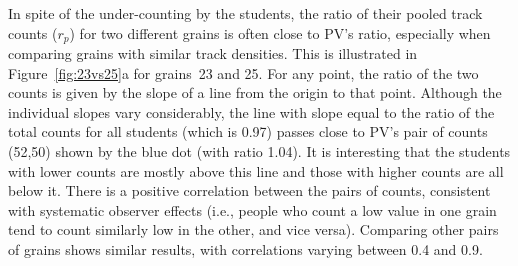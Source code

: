 \documentclass[gchron, manuscript]{copernicus}
\begin{document}
In spite of the under-counting by the students, the ratio of their
pooled track counts ($r_p$) for two different grains is often close to
PV's ratio, especially when comparing grains with similar track
densities. This is illustrated in Figure~\ref{fig:23vs25}a for
grains~23 and 25.  For any point, the ratio of the two counts is given
by the slope of a line from the origin to that point. Although the
individual slopes vary considerably, the line with slope equal to the
ratio of the total counts for all students (which is 0.97) passes
close to PV's pair of counts (52,50) shown by the blue dot (with ratio
1.04). It is interesting that the students with lower counts are
mostly above this line and those with higher counts are all below it.
There is a positive correlation between the pairs of counts,
consistent with systematic observer effects (i.e., people who count a
low value in one grain tend to count similarly low in the other, and
vice versa). Comparing other pairs of grains shows similar results,
with correlations varying between 0.4 and 0.9.\medskip
\end{document}
